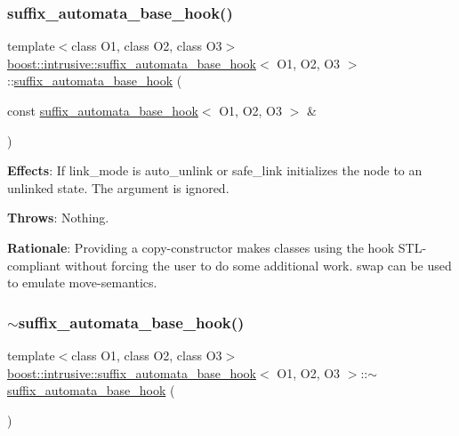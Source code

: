 \subsubsection{\texorpdfstring{suffix\+\_\+automata\+\_\+base\+\_\+hook()}{suffix\_automata\_base\_hook()}\hspace{0.1cm}{\footnotesize\ttfamily [2/2]}}
{\footnotesize\ttfamily template$<$class O1, class O2, class O3$>$ \\
\hyperlink{classboost_1_1intrusive_1_1suffix__automata__base__hook}{boost\+::intrusive\+::suffix\+\_\+automata\+\_\+base\+\_\+hook}$<$ O1, O2, O3 $>$\+::\hyperlink{classboost_1_1intrusive_1_1suffix__automata__base__hook}{suffix\+\_\+automata\+\_\+base\+\_\+hook} (\begin{DoxyParamCaption}\item[{const \hyperlink{classboost_1_1intrusive_1_1suffix__automata__base__hook}{suffix\+\_\+automata\+\_\+base\+\_\+hook}$<$ O1, O2, O3 $>$ \&}]{ }\end{DoxyParamCaption})}

{\bfseries Effects}\+: If link\+\_\+mode is {\ttfamily auto\+\_\+unlink} or {\ttfamily safe\+\_\+link} initializes the node to an unlinked state. The argument is ignored.

{\bfseries Throws}\+: Nothing.

{\bfseries Rationale}\+: Providing a copy-\/constructor makes classes using the hook S\+T\+L-\/compliant without forcing the user to do some additional work. {\ttfamily swap} can be used to emulate move-\/semantics. \mbox{\label{classboost_1_1intrusive_1_1suffix__automata__base__hook_ae5bb92cac33b7648f6b3a152de04c54e}} 
\subsubsection{\texorpdfstring{$\sim$suffix\+\_\+automata\+\_\+base\+\_\+hook()}{~suffix\_automata\_base\_hook()}}
{\footnotesize\ttfamily template$<$class O1, class O2, class O3$>$ \\
\hyperlink{classboost_1_1intrusive_1_1suffix__automata__base__hook}{boost\+::intrusive\+::suffix\+\_\+automata\+\_\+base\+\_\+hook}$<$ O1, O2, O3 $>$\+::$\sim$\hyperlink{classboost_1_1intrusive_1_1suffix__automata__base__hook}{suffix\+\_\+automata\+\_\+base\+\_\+hook} (\begin{DoxyParamCaption}{ }\end{DoxyParamCaption})}


